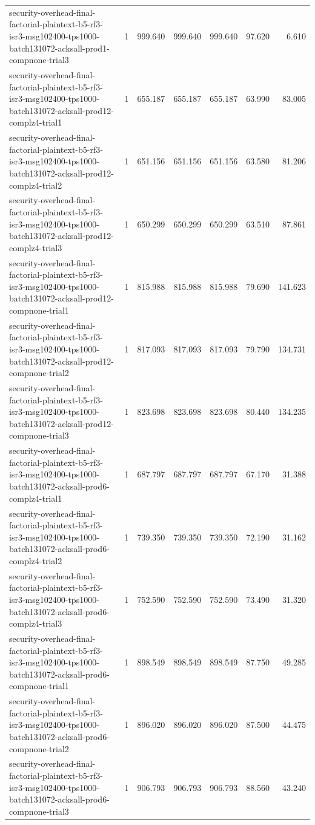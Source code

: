 \begin{tabular}{lrrrrrr}
security-overhead-final-factorial-plaintext-b5-rf3-isr3-msg102400-tps1000-batch131072-acksall-prod1-compnone-trial3 & 1 & 999.640 & 999.640 & 999.640 & 97.620 & 6.610 \\
security-overhead-final-factorial-plaintext-b5-rf3-isr3-msg102400-tps1000-batch131072-acksall-prod12-complz4-trial1 & 1 & 655.187 & 655.187 & 655.187 & 63.990 & 83.005 \\
security-overhead-final-factorial-plaintext-b5-rf3-isr3-msg102400-tps1000-batch131072-acksall-prod12-complz4-trial2 & 1 & 651.156 & 651.156 & 651.156 & 63.580 & 81.206 \\
security-overhead-final-factorial-plaintext-b5-rf3-isr3-msg102400-tps1000-batch131072-acksall-prod12-complz4-trial3 & 1 & 650.299 & 650.299 & 650.299 & 63.510 & 87.861 \\
security-overhead-final-factorial-plaintext-b5-rf3-isr3-msg102400-tps1000-batch131072-acksall-prod12-compnone-trial1 & 1 & 815.988 & 815.988 & 815.988 & 79.690 & 141.623 \\
security-overhead-final-factorial-plaintext-b5-rf3-isr3-msg102400-tps1000-batch131072-acksall-prod12-compnone-trial2 & 1 & 817.093 & 817.093 & 817.093 & 79.790 & 134.731 \\
security-overhead-final-factorial-plaintext-b5-rf3-isr3-msg102400-tps1000-batch131072-acksall-prod12-compnone-trial3 & 1 & 823.698 & 823.698 & 823.698 & 80.440 & 134.235 \\
security-overhead-final-factorial-plaintext-b5-rf3-isr3-msg102400-tps1000-batch131072-acksall-prod6-complz4-trial1 & 1 & 687.797 & 687.797 & 687.797 & 67.170 & 31.388 \\
security-overhead-final-factorial-plaintext-b5-rf3-isr3-msg102400-tps1000-batch131072-acksall-prod6-complz4-trial2 & 1 & 739.350 & 739.350 & 739.350 & 72.190 & 31.162 \\
security-overhead-final-factorial-plaintext-b5-rf3-isr3-msg102400-tps1000-batch131072-acksall-prod6-complz4-trial3 & 1 & 752.590 & 752.590 & 752.590 & 73.490 & 31.320 \\
security-overhead-final-factorial-plaintext-b5-rf3-isr3-msg102400-tps1000-batch131072-acksall-prod6-compnone-trial1 & 1 & 898.549 & 898.549 & 898.549 & 87.750 & 49.285 \\
security-overhead-final-factorial-plaintext-b5-rf3-isr3-msg102400-tps1000-batch131072-acksall-prod6-compnone-trial2 & 1 & 896.020 & 896.020 & 896.020 & 87.500 & 44.475 \\
security-overhead-final-factorial-plaintext-b5-rf3-isr3-msg102400-tps1000-batch131072-acksall-prod6-compnone-trial3 & 1 & 906.793 & 906.793 & 906.793 & 88.560 & 43.240 \\

\end{tabular}
